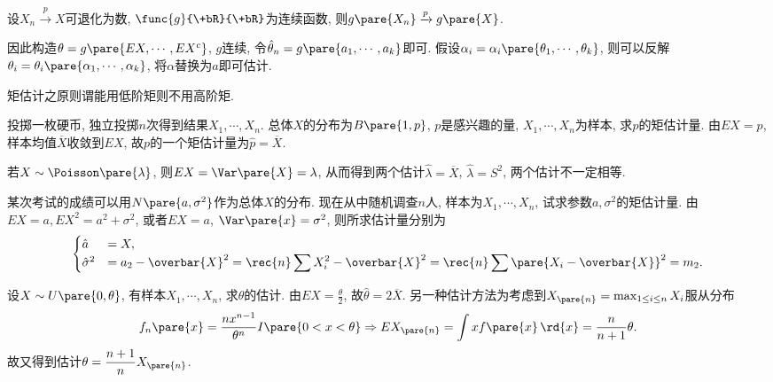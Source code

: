 \documentclass[../Statistics.tex]{subfiles}
\begin{document}
\begin{proposition}
    设$X_n \xrightarrow{p} X$可退化为数, $\func{g}{\+bR}{\+bR}$为连续函数, 则$g\pare{X_n}\xrightarrow{p}g\pare{X}$.
\end{proposition}
因此构造$\theta = g\pare{EX,\cdots,EX^c}$, $g$连续, 令$\hat\theta_n = g\pare{a_1,\cdots,a_k}$即可. 假设$\alpha_i = \alpha_i\pare{\theta_1,\cdots,\theta_k}$, 则可以反解$\theta_i = \theta_i \pare{\alpha_1,\cdots,\alpha_k}$, 将$\alpha$替换为$a$即可估计.
\par
矩估计之原则谓能用低阶矩则不用高阶矩.
\begin{sample}
    \begin{ex}
        投掷一枚硬币, 独立投掷$n$次得到结果$X_1,\cdots,X_n$. 总体$X$的分布为$B\pare{1,p}$, $p$是感兴趣的量, $X_1,\cdots,X_n$为样本, 求$p$的矩估计量. 由$EX = p$, 样本均值$\overbar{X}$收敛到$EX$, 故$p$的一个矩估计量为$\hat p = \overbar{X}$.
    \end{ex}
\end{sample}
\begin{ex}
    若$X\sim \Poisson\pare{\lambda}$, 则$EX = \Var\pare{X} = \lambda$, 从而得到两个估计$\hat\lambda = \overbar{X}$, $\hat\lambda = S^2$, 两个估计不一定相等.
\end{ex}
\begin{sample}
    \begin{ex}
        某次考试的成绩可以用$N\pare{a,\sigma^2}$作为总体$X$的分布. 现在从中随机调查$n$人, 样本为$X_1,\cdots,X_n$, 试求参数$a,\sigma^2$的矩估计量. 由$EX = a, EX^2 = a^2 + \sigma^2$, 或者$EX = a$, $\Var\pare{x} = \sigma^2$, 则所求估计量分别为
        \[ \begin{cases}
            \hat{a} &= X, \\
            \hat{\sigma}^2 &= a_2 - \overbar{X}^2 = \displaystyle \rec{n}\sum X_i^2 - \overbar{X}^2 = \rec{n} \sum\pare{X_i - \overbar{X}}^2 = m_2.
        \end{cases} \]
    \end{ex}
\end{sample}
\begin{sample}
    \begin{ex}
        设$X\sim U\pare{0,\theta}$, 有样本$X_1,\cdots,X_n$, 求$\theta$的估计. 由$\displaystyle EX = \frac{\theta}{2}$, 故$\hat\theta = 2\overbar{X}$. 另一种估计方法为考虑到$X_{\pare{n}} = \max_{1\le i \le n} X_i$服从分布
        \[ f_n\pare{x} = \frac{nx^{n-1}}{\theta^n} I\pare{0<x<\theta}\Rightarrow EX_{\pare{n}} = \int xf\pare{x}\,\rd{x} = \frac{n}{n+1}\theta. \]
        故又得到估计$\displaystyle \theta = \frac{n+1}{n} X_{\pare{n}}$.
    \end{ex}
\end{sample}
\end{document}
